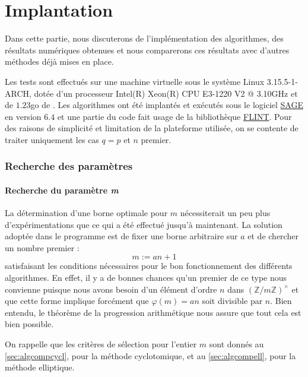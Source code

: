 \documentclass[a4paper]{article} %
\numberwithin{section}{part}
\numberwithin{equation}{section}
\newcommand\zmodninv[1]{(\mathbb{Z}/#1\mathbb{Z})^{\times}}
\begin{document}
\part{Implantation}
\label{trois}
Dans cette partie, nous discuterons de l'implémentation des algorithmes, des
résultats numériques obtenues et nous comparerons ces résultats avec d'autres
méthodes déjà mises en place.\par
Les tests sont effectués sur une machine virtuelle sous le système Linux 
3.15.5-1-ARCH, dotée d'un processeur Intel(R) Xeon(R) CPU E3-1220 V2 @ 3.10GHz 
et de $1.23$go de . Les algorithmes ont été implantés et 
exécutés sous le logiciel \href{http://www.sagemath.org/}{SAGE} en version 
$6.4$ et une partie du code fait usage de la bibliothèque 
\href{http://www.flintlib.org/}{FLINT}. Pour des raisons de simplicité et
limitation de la plateforme utilisée, on se contente de traiter uniquement les 
cas $q = p$ et $n$ premier.
\section{Recherche des paramètres}

\subsection{Recherche du paramètre \emph{m}}
La détermination d'une borne optimale pour $m$ nécessiterait un peu plus
d'expérimentations que ce qui a été effectué jusqu'à maintenant. La solution 
adoptée dans le programme est de fixer une borne arbitraire sur $a$ et de 
chercher un nombre premier :
\begin{equation}
\label{eq:formedem}
m := an + 1 
\end{equation}
satisfaisant les conditions nécessaires pour le bon fonctionnement
des différents algorithmes. En effet, il y a de bonnes chances qu'un premier de 
ce type nous convienne puisque nous avons besoin d'un élément d'ordre $n$ dans
$\zmodninv{m}$ et que cette forme implique forcément que $\varphi(m) = 
an$ soit divisible par $n$. Bien entendu, le théorème de la progression
arithmétique nous assure que tout cela est bien possible.\par
On rappelle que les critères de sélection pour l'entier $m$ sont donnés au 
\ref{sec:algcompcycl}, pour la méthode cyclotomique, et au \ref{sec:algcompell},
pour la méthode elliptique.
\end{document}
